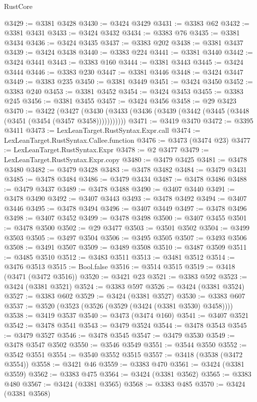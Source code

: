 \begin{lexlean}{RustCore}
\begin{coremodule}
@3429 := @3381 @3428
@3430 := @3424 @3429
@3431 := @3383 @62
@3432 := @3381 @3431
@3433 := @3424 @3432
@3434 := @3383 @76
@3435 := @3381 @3434
@3436 := @3424 @3435
@3437 := @3383 @202
@3438 := @3381 @3437
@3439 := @3424 @3438
@3440 := @3383 @224
@3441 := @3381 @3440
@3442 := @3424 @3441
@3443 := @3383 @160
@3444 := @3381 @3443
@3445 := @3424 @3444
@3446 := @3383 @230
@3447 := @3381 @3446
@3448 := @3424 @3447
@3449 := @3383 @235
@3450 := @3381 @3449
@3451 := @3424 @3450
@3452 := @3383 @240
@3453 := @3381 @3452
@3454 := @3424 @3453
@3455 := @3383 @245
@3456 := @3381 @3455
@3457 := @3424 @3456
@3458 := @29 @3423
@3470 := @3422
    (@3427 (@3430 (@3433 (@3436 (@3439 (@3442 (@3445 (@3448 (@3451 (@3454 (@3457 @3458)))))))))))
@3471 := @3419 @3470
@3472 := @3395 @3411
@3473 := LexLeanTarget.RustSyntax.Expr.call
@3474 := LexLeanTarget.RustSyntax.Callee.function
@3476 := @3473 (@3474 @23)
@3477 := LexLeanTarget.RustSyntax.Expr
@3478 := @2 @3477
@3479 := LexLeanTarget.RustSyntax.Expr.copy
@3480 := @3479 @3425
@3481 := @3478 @3480
@3482 := @3479 @3428
@3483 := @3478 @3482
@3484 := @3479 @3431
@3485 := @3478 @3484
@3486 := @3479 @3434
@3487 := @3478 @3486
@3488 := @3479 @3437
@3489 := @3478 @3488
@3490 := @3407 @3440
@3491 := @3478 @3490
@3492 := @3407 @3443
@3493 := @3478 @3492
@3494 := @3407 @3446
@3495 := @3478 @3494
@3496 := @3407 @3449
@3497 := @3478 @3496
@3498 := @3407 @3452
@3499 := @3478 @3498
@3500 := @3407 @3455
@3501 := @3478 @3500
@3502 := @29 @3477
@3503 := @3501 @3502
@3504 := @3499 @3503
@3505 := @3497 @3504
@3506 := @3495 @3505
@3507 := @3493 @3506
@3508 := @3491 @3507
@3509 := @3489 @3508
@3510 := @3487 @3509
@3511 := @3485 @3510
@3512 := @3483 @3511
@3513 := @3481 @3512
@3514 := @3476 @3513
@3515 := Bool.false
@3516 := @3514 @3515
@3519 := @3418 (@3471 (@3472 @3516))
@3520 := @3421 @23
@3521 := @3383 @592
@3523 := @3424 (@3381 @3521)
@3524 := @3383 @597
@3526 := @3424 (@3381 @3524)
@3527 := @3383 @602
@3529 := @3424 (@3381 @3527)
@3530 := @3383 @607
@3537 := @3520 (@3523 (@3526 (@3529 (@3424 (@3381 @3530) @3458))))
@3538 := @3419 @3537
@3540 := @3473 (@3474 @160)
@3541 := @3407 @3521
@3542 := @3478 @3541
@3543 := @3479 @3524
@3544 := @3478 @3543
@3545 := @3479 @3527
@3546 := @3478 @3545
@3547 := @3479 @3530
@3549 := @3478 @3547 @3502
@3550 := @3546 @3549
@3551 := @3544 @3550
@3552 := @3542 @3551
@3554 := @3540 @3552 @3515
@3557 := @3418 (@3538 (@3472 @3554))
@3558 := @3421 @46
@3559 := @3383 @470
@3561 := @3424 (@3381 @3559)
@3562 := @3383 @475
@3564 := @3424 (@3381 @3562)
@3565 := @3383 @480
@3567 := @3424 (@3381 @3565)
@3568 := @3383 @485
@3570 := @3424 (@3381 @3568)

\end{coremodule}
\end{lexlean}
